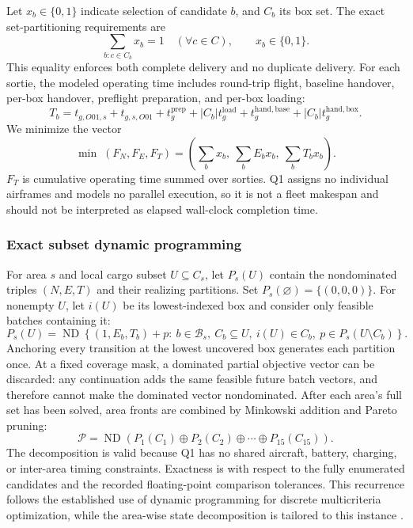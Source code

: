 \documentclass[11pt,a4paper]{article}
\newcommand{\ND}{\operatorname{ND}}
\begin{document}
Let $x_b\in\{0,1\}$ indicate selection of candidate $b$, and $C_b$ its box set. The exact set-partitioning requirements are
\begin{equation}
\sum_{b:c\in C_b}x_b=1\quad(\forall c\in C),\qquad x_b\in\{0,1\}.
\label{eq:partition}
\end{equation}
This equality enforces both complete delivery and no duplicate delivery. For each sortie, the modeled operating time includes round-trip flight, baseline handover, per-box handover, preflight preparation, and per-box loading:
\begin{equation}
T_b=t_{g,O01,s}+t_{g,s,O01}+t_g^{\mathrm{prep}}+|C_b|t_g^{\mathrm{load}}+t_g^{\mathrm{hand,base}}+|C_b|t_g^{\mathrm{hand,box}}.
\label{eq:batchtime}
\end{equation}
We minimize the vector
\begin{equation}
\min\;(F_N,F_E,F_T)=\left(\sum_bx_b,\ \sum_bE_bx_b,\ \sum_bT_bx_b\right).
\label{eq:objectives}
\end{equation}
$F_T$ is cumulative operating time summed over sorties. Q1 assigns no individual airframes and models no parallel execution, so it is not a fleet makespan and should not be interpreted as elapsed wall-clock completion time.

\subsubsection{Exact subset dynamic programming}
For area $s$ and local cargo subset $U\subseteq C_s$, let $P_s(U)$ contain the nondominated triples $(N,E,T)$ and their realizing partitions. Set $P_s(\varnothing)=\{(0,0,0)\}$. For nonempty $U$, let $i(U)$ be its lowest-indexed box and consider only feasible batches containing it:
\begin{equation}
P_s(U)=\ND\left\{(1,E_b,T_b)+p:\ b\in\mathcal B_s,\ C_b\subseteq U,\ i(U)\in C_b,\ p\in P_s(U\setminus C_b)\right\}.
\label{eq:dp}
\end{equation}
Anchoring every transition at the lowest uncovered box generates each partition once. At a fixed coverage mask, a dominated partial objective vector can be discarded: any continuation adds the same feasible future batch vectors, and therefore cannot make the dominated vector nondominated. After each area's full set has been solved, area fronts are combined by Minkowski addition and Pareto pruning:
\begin{equation}
\mathcal P=\ND\left(P_1(C_1)\oplus P_2(C_2)\oplus\cdots\oplus P_{15}(C_{15})\right).
\label{eq:merge}
\end{equation}
The decomposition is valid because Q1 has no shared aircraft, battery, charging, or inter-area timing constraints. Exactness is with respect to the fully enumerated candidates and the recorded floating-point comparison tolerances. This recurrence follows the established use of dynamic programming for discrete multicriteria optimization, while the area-wise state decomposition is tailored to this instance \cite{carraway1990,ehrgott2000}.
\end{document}
